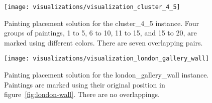 \begin{figure}[h!]
    \texttt{[image: visualizations/visualization\_cluster\_4\_5]}
    \caption[Painting placement solution for the cluster\_4\_5 instance]
        { Painting placement solution for the cluster\_4\_5 instance.
    Four groups of paintings, 1 to 5, 6 to 10, 11 to 15, and 15 to 20, are marked using different colors.
    There are seven overlapping pairs.}
    \label{fig:results:visualization-cluster-4-5}
\end{figure}

\begin{figure}[h!]
    \texttt{[image: visualizations/visualization\_london\_gallery\_wall]}
    \caption[Painting placement solution for the london\_gallery\_wall instance]
        { Painting placement solution for the london\_gallery\_wall instance.
    Paintings are marked using their original position in figure~\ref{fig:london-wall}.
    There are no overlappings.}
    \label{fig:results:visualization-london-gallery-wall}
\end{figure}
